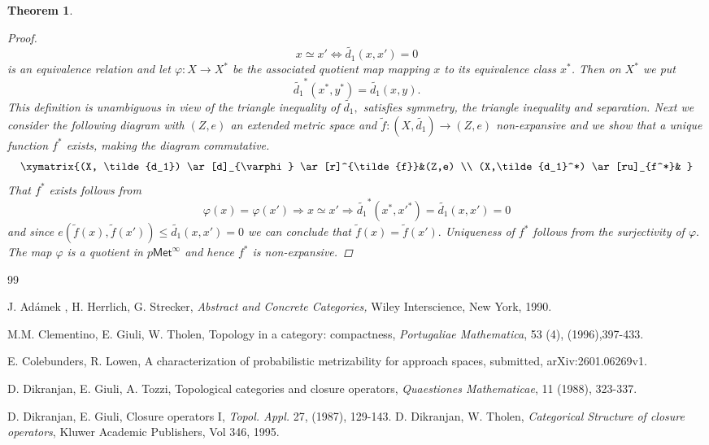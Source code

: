 \documentclass[12pt,a4paper]{amsart}
\theoremstyle{theorem}
\newtheorem{theorem}{Theorem}[section]
\theoremstyle{definition}
\newcommand{\met}{\ensuremath{\mathsf{Met}}}
\def\rw{\rightarrow}
\begin{document}
{\begin{theorem}
\begin{proof}
$$x \simeq x' \Leftrightarrow \tilde{d_1}(x,x')  = 0$$ is an equivalence relation and
let $\varphi: X \rw X^*$ be the associated quotient map mapping $x$ to its equivalence class $x^*$.
Then  on $X^*$ we put 
$$
\tilde{d_1}^*(x^*, y^*) = \tilde{d_1} (x,y).
$$
This definition is unambiguous in view of the triangle inequality of $\tilde{d_1},$ satisfies symmetry, the triangle inequality and separation.
Next we consider the following diagram with $(Z,e)$ an extended metric space and $\tilde{f} : (X, \tilde{d_1}) \rw (Z,e)$ non-expansive and we show that a unique function $f^*$ exists, making the diagram commutative.
$$
\xymatrix{(X, \tilde{d_1})  \ar[d]_{\varphi} \ar[r]^{\tilde{f}}&(Z,e)  \\
(X,\tilde{d_1}^*) \ar[ru]_{f^*}&
}
$$ 
That $f^*$ exists follows from 
$$
\varphi(x)= \varphi(x') \Rightarrow x \simeq x' \Rightarrow \tilde{d_1}^* (x^*,x'^*) = \tilde{d_1}(x,x') = 0
$$ 
and since $e( \tilde{f}(x), \tilde{f}(x')) \leq \tilde{d_1} (x,x') = 0$ we can conclude that $\tilde{f} (x) = \tilde{f} (x').$
Uniqueness of $f^*$ follows from the surjectivity of $\varphi.$ The map $\varphi$ is a quotient in $p\met^\infty$ and hence $f^*$ is non-expansive.
\end {proof}
\end{theorem}



\begin{thebibliography}{99}

 J. Ad\'{a}mek , H. Herrlich, G. Strecker, \emph{Abstract and Concrete Categories,} Wiley Interscience, New York, 1990.




 M.M. Clementino, E. Giuli, W. Tholen, Topology in a category: compactness, \emph{Portugaliae Mathematica}, 53 (4), (1996),397-433.

 E. Colebunders, R. Lowen, A characterization of probabilistic metrizability for approach spaces, submitted, arXiv:2601.06269v1.


 D. Dikranjan, E. Giuli, A. Tozzi, Topological categories and closure operators, \emph{Quaestiones Mathematicae}, 11 (1988), 323-337.

 D. Dikranjan, E. Giuli, Closure operators I, \emph{Topol. Appl.} 27, (1987), 129-143.
 D. Dikranjan, W. Tholen, \emph{Categorical Structure of closure operators}, Kluwer Academic Publishers, Vol 346, 1995.


 
 

\end{thebibliography}}
\end{document}
